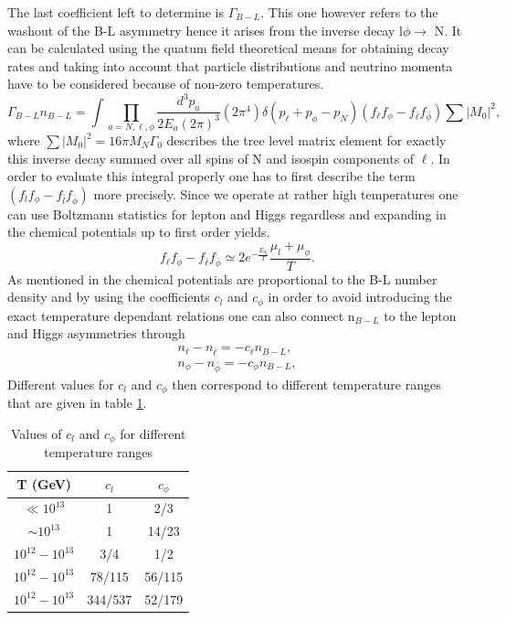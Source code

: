 The last coefficient left to determine is $\Gamma_{B-L}$. This one however refers to the washout of the B-L asymmetry hence it arises from the inverse decay l$\phi\rightarrow$ N. It can be calculated using the quatum field theoretical means for obtaining decay rates and taking into account that particle distributions and neutrino momenta have to be considered because of non-zero temperatures.
\begin{equation}
\Gamma_{B-L}n_{B-L}=\int\prod_{a=N,\ell,\phi}\frac{d^3p_a}{2E_a(2\pi)^3}(2\pi^4)\delta(p_\ell+p_\phi-p_N)(	f_\ell f_\phi-f_{\bar{\ell}}f_{\bar{\phi}})\sum|M_0|^2,
\label{eq:Gamma_B-L}
\end{equation}
where $\sum|M_0|^2=16\pi M_N\Gamma_0$ describes the tree level matrix element for exactly this inverse decay summed over all spins of N and isospin components of $\ell$. In order to evaluate this integral properly one has to first describe the term $(	f_lf_\phi-f_{\bar{l}}f_{\bar{\phi}})$ more precisely. Since we operate at rather high temperatures one can use Boltzmann statistics for lepton and Higgs regardless and expanding in the chemical potentials up to first order yields.
\begin{equation}
	f_\ell f_\phi-f_{\bar{\ell}}f_{\bar{\phi}}\simeq 2e^{-\frac{E_N}{T}}\frac{\mu_l+\mu_\phi}{T}.
	\label{eq:distri_diff}
\end{equation}
As mentioned in \cite[p. 7]{Bodeker:2013qaa} the chemical potentials are proportional to the B-L number density and by using the coefficients $c_l$ and $c_\phi$ in order to avoid introducing the exact temperature dependant relations one can also connect n$_{B-L}$ to the lepton and Higgs asymmetries through \cite[p. 7]{Bodeker:2013qaa}
\begin{align}
	n_\ell-n_{\bar{\ell}}=-c_\ell n_{B-L},
	\label{eq:l-lbar} \\
	n_\phi-n_{\bar{\phi}}=-c_\phi n_{B-L},
	\label{eq:phi-phibar}
\end{align}
Different values for $c_l$ and $c_\phi$ then correspond to different temperature ranges that are given in table \ref{tab:temperatur}\cite[Table 1]{Bodeker:2013qaa}.

	\begin{table}[H]
	\centering
	\begin{tabular}{c|c||c}
	T (GeV)& $c_l$ & $c_\phi$\\
	\hline
	$\ll10^{13}$&1&2/3\\
	$\sim10^{13}$&1&14/23\\
	$10^{12}-10^{13}$&3/4&1/2\\
	$10^{12}-10^{13}$&78/115&56/115\\
	$10^{12}-10^{13}$&344/537&52/179\\
	
	\end{tabular}
	\caption{Values of $c_l$ and $c_\phi$ for different temperature ranges}
	\label{tab:temperatur}
	\end{table}

